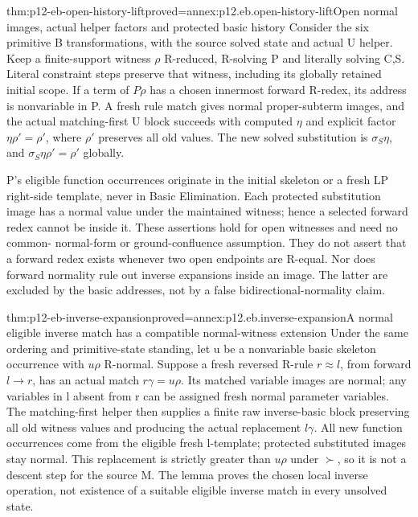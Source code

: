 \begin{hbtheorem}{thm:p12-eb-open-history-lift}{proved=annex:p12.eb.open-history-lift}{Open normal images, actual helper factors and protected basic history}
Consider the six primitive B transformations, with the source solved
state and actual U helper. Keep a finite-support witness \(\rho\)
R-reduced, R-solving P and literally solving C,S. Literal constraint
steps preserve that witness, including its globally retained initial
scope. If a term of \(P\rho\) has a chosen innermost forward R-redex,
its address is nonvariable in P. A fresh rule match gives normal
proper-subterm images, and the actual matching-first U block succeeds
with computed \(\eta\) and explicit factor
\(\eta\rho'=\rho'\), where \(\rho'\) preserves all old values.
The new solved substitution is \(\sigma_S\eta\), and
\(\sigma_S\eta\rho'=\rho'\) globally.

P's eligible function occurrences originate in the initial skeleton
or a fresh LP right-side template, never in Basic Elimination.
Each protected substitution image has a normal value under the
maintained witness; hence a selected forward redex cannot be inside
it. These assertions hold for open witnesses and need no common-
normal-form or ground-confluence assumption. They do not assert
that a forward redex exists whenever two open endpoints are R-equal.
Nor does forward normality rule out inverse expansions inside an
image. The latter are excluded by the basic addresses, not by a
false bidirectional-normality claim.
\end{hbtheorem}

\begin{hblemma}{thm:p12-eb-inverse-expansion}{proved=annex:p12.eb.inverse-expansion}{A normal eligible inverse match has a compatible normal-witness extension}
Under the same ordering and primitive-state standing, let u be a
nonvariable basic skeleton occurrence with \(u\rho\) R-normal.
Suppose a fresh reversed R-rule \(r\approx l\), from forward
\(l\to r\), has an actual match \(r\gamma=u\rho\).
Its matched variable images are normal; any variables in l absent
from r can be assigned fresh normal parameter variables. The
matching-first helper then supplies a finite raw inverse-basic
block preserving all old witness values and producing the actual
replacement \(l\gamma\). All new function occurrences come from
the eligible fresh l-template; protected substituted images stay
normal. This replacement is strictly greater than \(u\rho\)
under \(\succ\), so it is not a descent step for the source M.
The lemma proves the chosen local inverse operation, not existence
of a suitable eligible inverse match in every unsolved state.
\end{hblemma}

